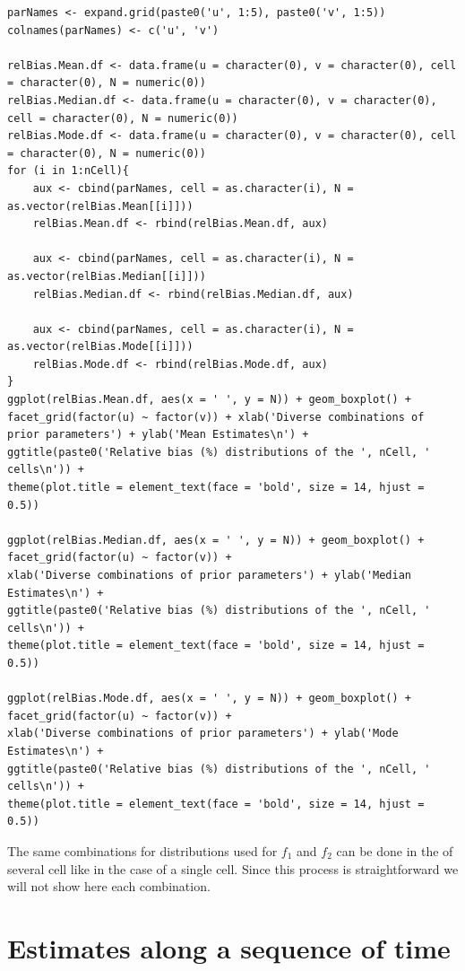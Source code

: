 \documentclass[12pt, a4paper]{article}
\begin{document}
\begin{verbatim}
parNames <- expand.grid(paste0('u', 1:5), paste0('v', 1:5))
colnames(parNames) <- c('u', 'v')

relBias.Mean.df <- data.frame(u = character(0), v = character(0), cell = character(0), N = numeric(0))
relBias.Median.df <- data.frame(u = character(0), v = character(0), cell = character(0), N = numeric(0))
relBias.Mode.df <- data.frame(u = character(0), v = character(0), cell = character(0), N = numeric(0))
for (i in 1:nCell){
    aux <- cbind(parNames, cell = as.character(i), N = as.vector(relBias.Mean[[i]]))
    relBias.Mean.df <- rbind(relBias.Mean.df, aux)

    aux <- cbind(parNames, cell = as.character(i), N = as.vector(relBias.Median[[i]]))
    relBias.Median.df <- rbind(relBias.Median.df, aux)

    aux <- cbind(parNames, cell = as.character(i), N = as.vector(relBias.Mode[[i]]))
    relBias.Mode.df <- rbind(relBias.Mode.df, aux)
}
ggplot(relBias.Mean.df, aes(x = ' ', y = N)) + geom_boxplot() +
facet_grid(factor(u) ~ factor(v)) + xlab('Diverse combinations of prior parameters') + ylab('Mean Estimates\n') +
ggtitle(paste0('Relative bias (%) distributions of the ', nCell, ' cells\n')) +
theme(plot.title = element_text(face = 'bold', size = 14, hjust = 0.5))

ggplot(relBias.Median.df, aes(x = ' ', y = N)) + geom_boxplot() +
facet_grid(factor(u) ~ factor(v)) +
xlab('Diverse combinations of prior parameters') + ylab('Median Estimates\n') +
ggtitle(paste0('Relative bias (%) distributions of the ', nCell, ' cells\n')) +
theme(plot.title = element_text(face = 'bold', size = 14, hjust = 0.5))

ggplot(relBias.Mode.df, aes(x = ' ', y = N)) + geom_boxplot() +
facet_grid(factor(u) ~ factor(v)) +
xlab('Diverse combinations of prior parameters') + ylab('Mode Estimates\n') +
ggtitle(paste0('Relative bias (%) distributions of the ', nCell, ' cells\n')) +
theme(plot.title = element_text(face = 'bold', size = 14, hjust = 0.5))
\end{verbatim}

The same combinations for distributions used for $f_{1}$ and $f_{2}$ can be done in the of several cell like in 
the case of a single cell. Since this process is straightforward we will not show here each combination.


\section{Estimates along a sequence of time}
\end{document}
